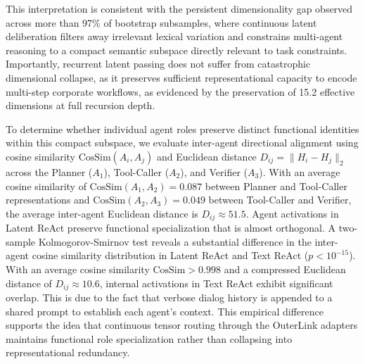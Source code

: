\documentclass[a4paper, 12pt]{report}
\begin{document}
This interpretation is consistent with the persistent dimensionality gap observed across more than 97\% of bootstrap subsamples, where continuous latent deliberation filters away irrelevant lexical variation and constrains multi-agent reasoning to a compact semantic subspace directly relevant to task constraints. Importantly, recurrent latent passing does not suffer from catastrophic dimensional collapse, as it preserves sufficient representational capacity to encode multi-step corporate workflows, as evidenced by the preservation of 15.2 effective dimensions at full recursion depth.

To determine whether individual agent roles preserve distinct functional identities within this compact subspace, we evaluate inter-agent directional alignment using cosine similarity $\text{CosSim}(A_i, A_j)$ and Euclidean distance $D_{ij} = \|H_i - H_j\|_2$ across the Planner ($A_1$), Tool-Caller ($A_2$), and Verifier ($A_3$). With an average cosine similarity of $\text{CosSim}(A_1, A_2) = 0.087$ between Planner and Tool-Caller representations and $\text{CosSim}(A_2, A_3) = 0.049$ between Tool-Caller and Verifier, the average inter-agent Euclidean distance is $D_{ij} \approx 51.5$. Agent activations in Latent ReAct preserve functional specialization that is almost orthogonal. A two-sample Kolmogorov-Smirnov test reveals a substantial difference in the inter-agent cosine similarity distribution in Latent ReAct and Text ReAct ($p < 10^{-15}$). With an average cosine similarity $\text{CosSim} > 0.998$ and a compressed Euclidean distance of $D_{ij} \approx 10.6$, internal activations in Text ReAct exhibit significant overlap. This is due to the fact that verbose dialog history is appended to a shared prompt to establish each agent's context. This empirical difference supports the idea that continuous tensor routing through the OuterLink adapters maintains functional role specialization rather than collapsing into representational redundancy.
\end{document}
